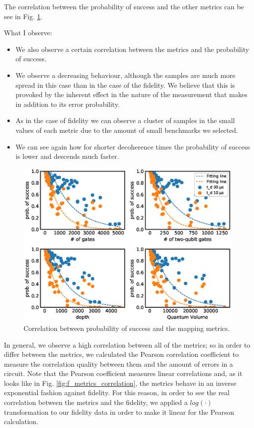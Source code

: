 The correlation between the probability of success and the other metrics can be see in Fig. \ref{fig:ps_metrics_correlation}.

What I observe:

\begin{itemize}
\item We also observe a certain correlation between the metrics and the probability of success.
\item We observe a decreasing behaviour, although the samples are much more spread in this case than in the case of the fidelity. We believe that this is provoked by the inherent effect in the nature of the measurement that makes in addition to its error probability.
\item As in the case of fidelity we can observe a cluster of samples in the small values of each metric due to the amount of small benchmarks we selected.
\item We can see again how for shorter decoherence times the probability of success is lower and descends much faster.
\end{itemize}


\begin{figure}[htbp]
\centering
\includegraphics[width=\textwidth]{figures/ps_metrics_correlation.eps}
\caption{\label{fig:ps_metrics_correlation}
Correlation between probability of success and the mapping metrics.}
\end{figure}

In general, we observe a high correlation between all of the metrics; so in order to differ between the metrics, we calculated the Pearson correlation coefficient to measure the correlation quality between them and the amount of errors in a circuit.
Note that the Pearson coefficient measures linear correlations and, as it looks like in Fig. \ref{fig:f_metrics_correlation}, the metrics behave in an inverse exponential fashion against fidelity.
For this reason, in order to see the real correlation between the metrics and the fidelity, we applied a \(log(·)\) transformation to our fidelity data in order to make it linear for the Pearson calculation.



